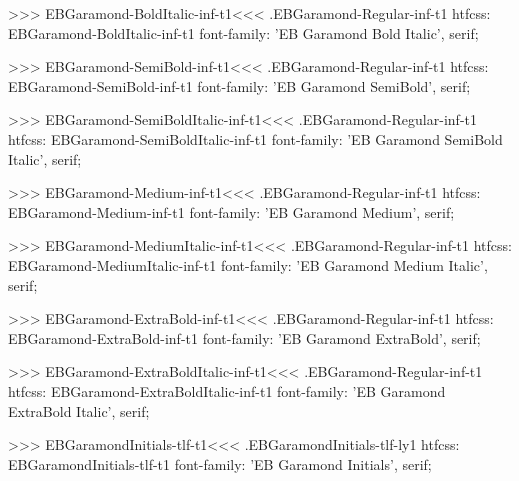 {{{{{{{>>>
\<EBGaramond-BoldItalic-inf-t1\><<<
.EBGaramond-Regular-inf-t1
htfcss:  EBGaramond-BoldItalic-inf-t1  font-family: 'EB Garamond Bold Italic', serif;

>>>
\<EBGaramond-SemiBold-inf-t1\><<<
.EBGaramond-Regular-inf-t1
htfcss:  EBGaramond-SemiBold-inf-t1  font-family: 'EB Garamond SemiBold', serif;

>>>
\<EBGaramond-SemiBoldItalic-inf-t1\><<<
.EBGaramond-Regular-inf-t1
htfcss:  EBGaramond-SemiBoldItalic-inf-t1  font-family: 'EB Garamond SemiBold Italic', serif;

>>>
\<EBGaramond-Medium-inf-t1\><<<
.EBGaramond-Regular-inf-t1
htfcss:  EBGaramond-Medium-inf-t1  font-family: 'EB Garamond Medium', serif;

>>>
\<EBGaramond-MediumItalic-inf-t1\><<<
.EBGaramond-Regular-inf-t1
htfcss:  EBGaramond-MediumItalic-inf-t1  font-family: 'EB Garamond Medium Italic', serif;

>>>
\<EBGaramond-ExtraBold-inf-t1\><<<
.EBGaramond-Regular-inf-t1
htfcss:  EBGaramond-ExtraBold-inf-t1  font-family: 'EB Garamond ExtraBold', serif;

>>>
\<EBGaramond-ExtraBoldItalic-inf-t1\><<<
.EBGaramond-Regular-inf-t1
htfcss:  EBGaramond-ExtraBoldItalic-inf-t1  font-family: 'EB Garamond ExtraBold Italic', serif;

>>>
\<EBGaramondInitials-tlf-t1\><<<
.EBGaramondInitials-tlf-ly1
htfcss:  EBGaramondInitials-tlf-t1  font-family: 'EB Garamond Initials', serif;

}}}}}}}
